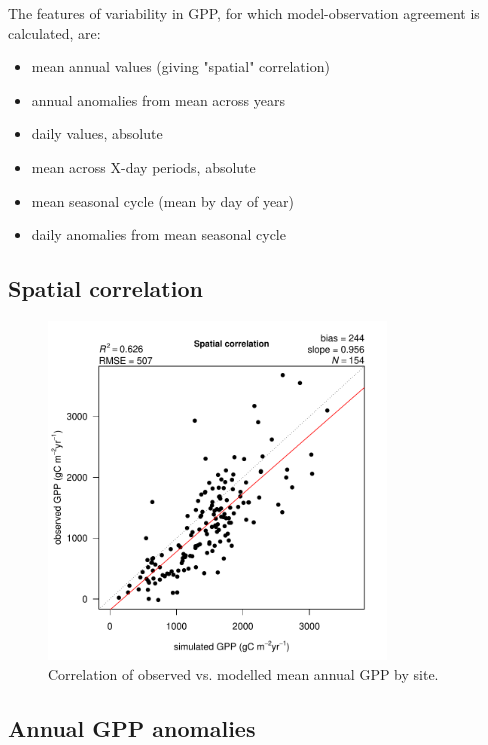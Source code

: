 \documentclass{myreport}
\begin{document}
The features of variability in GPP, for which model-observation agreement is calculated, are:
\begin{itemize}
    \item mean annual values (giving "spatial" correlation)
    \item annual anomalies from mean across years
    \item daily values, absolute
    \item mean across X-day periods, absolute
    \item mean seasonal cycle (mean by day of year)
    \item daily anomalies from mean seasonal cycle
\end{itemize}

\clearpage

\subsection{Spatial correlation}

\begin{figure}[!ht]
    \centering
    \includegraphics[width=0.8\textwidth]{fig/modobs_spatial.pdf}
    \caption{Correlation of observed vs. modelled mean annual GPP by site.}
    \label{fig:modobs_spatial}
\end{figure}

\clearpage


\subsection{Annual GPP anomalies}
\end{document}

